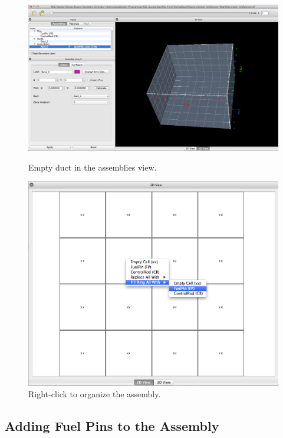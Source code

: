 \begin{figure}[b]
\centering
\begin{minipage}{.55\textwidth}
  \centering
  \includegraphics[width=0.95\linewidth]{Images/rect-empty-assy.png}
\caption{Empty duct in the assemblies view.}
\label{fig:Rect8}
\end{minipage}%
\hspace{0.5cm}
\begin{minipage}{.40\textwidth}
  \centering
 \includegraphics[width=0.95\linewidth]{Images/rect-assign-pin.png}
\caption{Right-click to organize the assembly.}
\label{fig:Rect9}
\end{minipage}
\end{figure}

\subsection{Adding Fuel Pins to the Assembly}

